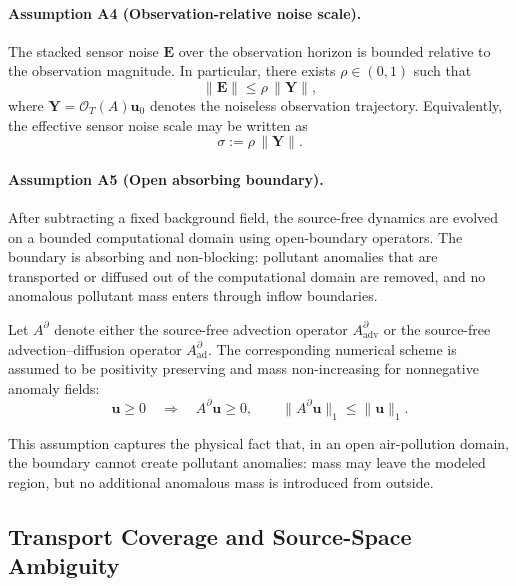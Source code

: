 \paragraph{Assumption A4 (Observation-relative noise scale).}
\label{ass:noise_scale}
The stacked sensor noise $\mathbf{E}$ over the observation horizon is bounded relative to the observation magnitude. In particular, there exists $\rho \in (0,1)$ such that
\begin{equation}
\|\mathbf{E}\| \le \rho\,\|\mathbf{Y}\|,
\end{equation}
where $\mathbf{Y} = \mathcal{O}_T(A)\mathbf{u}_0$ denotes the noiseless observation trajectory. Equivalently, the effective sensor noise scale may be written as
\begin{equation}
\sigma := \rho\,\|\mathbf{Y}\|.
\end{equation}

\paragraph{Assumption A5 (Open absorbing boundary).}
After subtracting a fixed background field, the source-free dynamics are
evolved on a bounded computational domain using open-boundary operators.
The boundary is absorbing and non-blocking: pollutant anomalies that are
transported or diffused out of the computational domain are removed, and
no anomalous pollutant mass enters through inflow boundaries.

Let \(A^{\partial}\) denote either the source-free advection operator
\(A_{\mathrm{adv}}^{\partial}\) or the source-free advection--diffusion
operator \(A_{\mathrm{ad}}^{\partial}\). The corresponding numerical
scheme is assumed to be positivity preserving and mass non-increasing
for nonnegative anomaly fields:
\begin{equation}
\mathbf u\ge 0
\quad\Longrightarrow\quad
A^{\partial}\mathbf u \ge 0,
\qquad
\|A^{\partial}\mathbf u\|_1
\le
\|\mathbf u\|_1.
\label{eq:open_boundary_mass_nonincrease}
\end{equation}

This assumption captures the physical fact that, in an open
air-pollution domain, the boundary cannot create pollutant anomalies:
mass may leave the modeled region, but no additional anomalous mass is
introduced from outside. 

\subsection{Transport Coverage and Source-Space Ambiguity}

